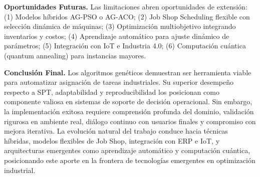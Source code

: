 \textbf{Oportunidades Futuras.} Las limitaciones abren oportunidades de extensión: (1) Modelos híbridos AG-PSO o AG-ACO; (2) Job Shop Scheduling flexible con selección dinámica de máquinas; (3) Optimización multiobjetivo integrando inventarios y costos; (4) Aprendizaje automático para ajuste dinámico de parámetros; (5) Integración con IoT e Industria 4.0; (6) Computación cuántica (quantum annealing) para instancias mayores.

\textbf{Conclusión Final.} Los algoritmos genéticos demuestran ser herramienta viable para automatizar asignación de tareas industriales. Su superior desempeño respecto a SPT, adaptabilidad y reproducibilidad los posicionan como componente valiosa en sistemas de soporte de decisión operacional. Sin embargo, la implementación exitosa requiere comprensión profunda del dominio, validación rigurosa en ambiente real, diálogo continuo con usuarios finales y compromiso con mejora iterativa. La evolución natural del trabajo conduce hacia técnicas híbridas, modelos flexibles de Job Shop, integración con ERP e IoT, y arquitecturas emergentes como aprendizaje automático y computación cuántica, posicionando este aporte en la frontera de tecnologías emergentes en optimización industrial.
